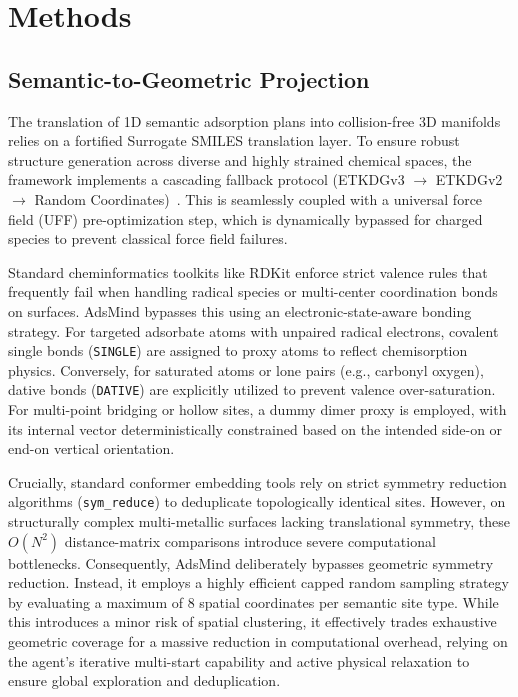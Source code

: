 \documentclass{article}
\begin{document}
\section{Methods}
\subsection{Semantic-to-Geometric Projection}
The translation of 1D semantic adsorption plans into collision-free 3D manifolds relies on a fortified Surrogate SMILES translation layer. To ensure robust structure generation across diverse and highly strained chemical spaces, the framework implements a cascading fallback protocol (ETKDGv3 $\rightarrow$ ETKDGv2 $\rightarrow$ Random Coordinates)~\cite{riniker2015better}. This is seamlessly coupled with a universal force field (UFF) pre-optimization step, which is dynamically bypassed for charged species to prevent classical force field failures.

Standard cheminformatics toolkits like RDKit enforce strict valence rules that frequently fail when handling radical species or multi-center coordination bonds on surfaces. AdsMind bypasses this using an electronic-state-aware bonding strategy. For targeted adsorbate atoms with unpaired radical electrons, covalent single bonds (\texttt{SINGLE}) are assigned to proxy atoms to reflect chemisorption physics. Conversely, for saturated atoms or lone pairs (e.g., carbonyl oxygen), dative bonds (\texttt{DATIVE}) are explicitly utilized to prevent valence over-saturation. For multi-point bridging or hollow sites, a dummy dimer proxy is employed, with its internal vector deterministically constrained based on the intended side-on or end-on vertical orientation.

Crucially, standard conformer embedding tools rely on strict symmetry reduction algorithms (\texttt{sym\_reduce}) to deduplicate topologically identical sites. However, on structurally complex multi-metallic surfaces lacking translational symmetry, these $O(N^2)$ distance-matrix comparisons introduce severe computational bottlenecks. Consequently, AdsMind deliberately bypasses geometric symmetry reduction. Instead, it employs a highly efficient capped random sampling strategy by evaluating a maximum of 8 spatial coordinates per semantic site type. While this introduces a minor risk of spatial clustering, it effectively trades exhaustive geometric coverage for a massive reduction in computational overhead, relying on the agent's iterative multi-start capability and active physical relaxation to ensure global exploration and deduplication. 
\end{document}
